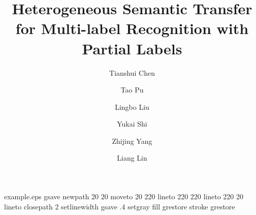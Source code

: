 \begin{filecontents*}{example.eps}
gsave
newpath
  20 20 moveto
  20 220 lineto
  220 220 lineto
  220 20 lineto
closepath
2 setlinewidth
gsave
  .4 setgray fill
grestore
stroke
grestore
\end{filecontents*}

\documentclass[twocolumn]{svjour3}         \smartqed  \usepackage{graphicx}

\usepackage{titlesec} \titleformat{\paragraph}[runin]
{\bfseries\scshape}{\theparagraph}{1em}{}
\titlespacing{\paragraph}{0em}{1ex}{.5em} \usepackage{todonotes}
\usepackage{booktabs}
\usepackage{tabularx}
\usepackage{multirow}
\usepackage{multicol}
\usepackage{bm}
\usepackage{url}
\usepackage{balance}
\usepackage{enumitem}
\usepackage{color}
\usepackage{bbding}
\usepackage{nccmath}
\usepackage{amsmath,amssymb}
\usepackage{graphicx}
\usepackage{cite}

\usepackage{graphicx}
\usepackage{amsmath}
\usepackage{amssymb}
\usepackage{color}
\usepackage{epstopdf}
\usepackage{array}
\usepackage{multirow}
\usepackage{amsfonts}
\usepackage{booktabs}
\usepackage{float}
\usepackage{subfigure}
\usepackage{algorithm}
\usepackage{algpseudocode}
\usepackage[switch]{lineno}



\title{Heterogeneous Semantic Transfer for Multi-label Recognition with Partial Labels
}




\author{Tianshui Chen \and
        Tao Pu \and
        Lingbo Liu \and
        Yukai Shi \and
        Zhijing Yang \and
        Liang Lin
}






